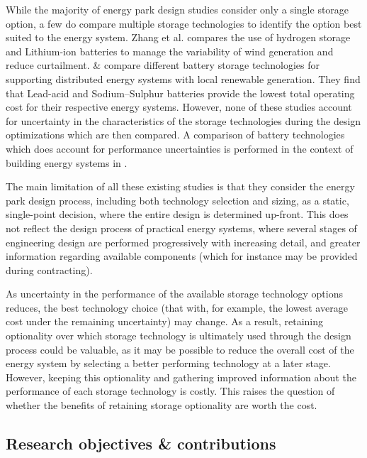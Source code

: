 While the majority of energy park design studies consider only a single storage option, a few do compare multiple storage technologies to identify the option best suited to the energy system.
Zhang et al. \citep{zhang2019BalancingWindpowerFluctuation} compares the use of hydrogen storage and Lithium-ion batteries to manage the variability of wind generation and reduce curtailment. \citep{mazzoni2019EnergyStorageTechnologies} \& \citep{mohseni2022QuantifyingEffectsForecast} compare different battery storage technologies for supporting distributed energy systems with local renewable generation. They find that Lead-acid and Sodium--Sulphur batteries provide the lowest total operating cost for their respective energy systems. However, none of these studies account for uncertainty in the characteristics of the storage technologies during the design optimizations which are then compared. A comparison of battery technologies which does account for performance uncertainties is performed in the context of building energy systems in \citep{chadly2023TechnoeconomicAssessmentEnergy}.

The main limitation of all these existing studies is that they consider the energy park design process, including both technology selection and sizing, as a static, single-point decision, where the entire design is determined up-front. This does not reflect the design process of practical energy systems, where several stages of engineering design are performed progressively with increasing detail, and greater information regarding available components (which for instance may be provided during contracting).

As uncertainty in the performance of the available storage technology options reduces, the best technology choice (that with, for example, the lowest average cost under the remaining uncertainty) may change. As a result, retaining optionality over which storage technology is ultimately used through the design process could be valuable, as it may be possible to reduce the overall cost of the energy system by selecting a better performing technology at a later stage. However, keeping this optionality and gathering improved information about the performance of each storage technology is costly. This raises the question of whether the benefits of retaining storage optionality are worth the cost.


\subsection{Research objectives \& contributions}

